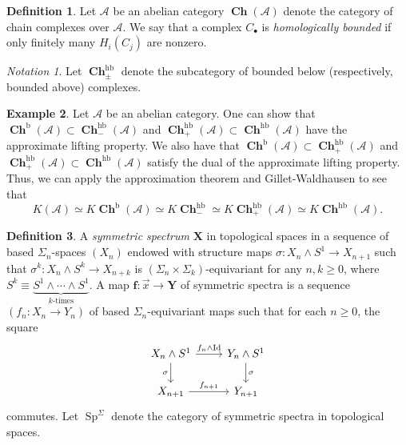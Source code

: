 \documentclass[10pt,letterpaper,cm]{nupset}
\theoremstyle{definition}
\newtheorem{definition}{Definition}
\newtheorem{exmp}[definition]{Example}
\theoremstyle{theorem}
\theoremstyle{remark}
\newtheorem*{notation}{Notation}
\newcommand{\X}{\mathbf X}
\newcommand{\1}{\mathbf{1}}
\renewcommand{\a}{\mathscr{A}}
\newcommand{\x}{\vec x}
\newcommand{\0}{\vec 0}
\DeclareMathOperator{\id}{Id}
\DeclareMathOperator{\hb}{hb}
\DeclareMathOperator{\bo}{b}
\DeclareMathOperator{\Sp}{Sp}
\DeclareMathOperator{\ch}{\mathbf{Ch}}
\begin{document}
\begin{definition}
Let $\a$ be an abelian category $\ch(\a)$ denote the category of chain complexes over $\a$. We say that a complex $C_{\bullet}$ is \textit{homologically bounded} if only finitely many $H_i(C_j)$ are nonzero. 
\end{definition}

\begin{notation}
Let $\ch_{\pm}^{\hb}$ denote the subcategory of bounded below (respectively, bounded above) complexes. 
\end{notation}

\begin{exmp}
Let $\a$ be an abelian category. One can show that $\ch^{\bo}(\a) \subset \ch_{-}^{\hb}(\a)$ and $\ch_+^{\hb}(\a)\subset \ch^{\hb}(\a)$ have the approximate lifting property. We also have that $\ch^{\bo}(\a) \subset \ch_+^{\hb}(\a)$ and $\ch_+^{\hb}(\a)\subset \ch^{\hb}(\a)$ satisfy the dual of the approximate lifting property. Thus, we can apply the approximation theorem and Gillet-Waldhausen to see that $$  K(\a) \simeq K\ch^{\bo}(\a) \simeq  K\ch_{-}^{\hb}\simeq K\ch_{+}^{\hb}(\a) \simeq K \ch^{\hb}(\a).$$
\end{exmp}

\bigskip

\begin{definition}
 A \textit{symmetric spectrum} $\X$ in topological spaces in a sequence of based $\Sigma_n$-spaces $(X_n)$ endowed with structure maps $\sigma : X_n \land S^1 \to X_{n+1}$ such that $\sigma^k : X_n \land S^k \to X_{n+k}$ is $\left(\Sigma_{n}\times \Sigma_{k}\right)$-equivariant for any $n,k\geq 0$, where $S^k \equiv \underbrace{S^1 \land \cdots \land S^1}_{k\text{-times}}$. A map $\mathbf{f} : \x \to \mathbf{Y}$ of symmetric spectra is a sequence $\left(f_n : X_n \to Y_n\right)$ of based $\Sigma_n$-equivariant maps such that for each $n\geq 0$, the square
\[
\begin{tikzcd}
X_n \land S^1 \arrow[d, "\sigma"'] \arrow[r, "f_n \land \id"] & Y_n \land S^1 \arrow[d, "\sigma"] \\
X_{n+1} \arrow[r, "f_{n+1}"] & Y_{n+1}
\end{tikzcd}
\]
commutes. Let $\Sp^{\Sigma}$ denote the category of symmetric spectra in topological spaces.
\end{definition}
\end{document}
